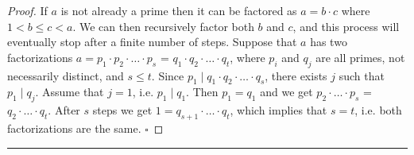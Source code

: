 \documentclass[10pt,varwidth=6in,margin=0.2in,preview]{standalone}
\begin{document}
\begin{flushleft}
\begin{proof}
If $a$ is not already a prime then it can be factored as $a = b \cdot c$ where $1 < b \le c < a$. 
We can then recursively factor both $b$ and $c$, and this process will eventually stop after a finite number of steps.
Suppose that $a$ has two factorizations $a = p_1 \cdot p_2 \cdot \ldots \cdot p_s$ = $q_1 \cdot q_2 \cdot \ldots \cdot q_t$, where $p_i$ and $q_j$ are all primes, not necessarily distinct, and $s \le t$.
Since $p_1 \mid q_1 \cdot q_2 \cdot \ldots \cdot q_s$, there exists $j$ such that $p_1 \mid q_j$.
Assume that $j = 1$, i.e. $p_1 \mid q_1$.
Then $p_1 = q_1$ and we get $p_2 \cdot \ldots \cdot p_s$ = $q_2 \cdot \ldots \cdot q_t$.
After $s$ steps we get $1 = q_{s+1} \cdot \ldots \cdot q_t$, which implies that $s = t$, i.e. both factorizations are the same. $\square$
\end{proof}



\vspace{4in}

\hrule

\end{flushleft}
\end{document}
